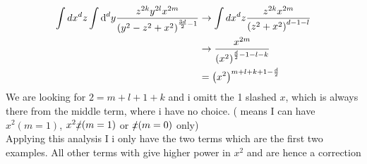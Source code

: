 \begin{align}
	\int dx ^d z\int \text{d} ^d y\frac{z^{2k} y^{2l} x^{2m}}{\left(y^2-z^2+x^2\right)^{\frac{3d}{2}-1}}
	&\rightarrow
	\int dx ^d z \frac{z^{2k} x^{2m}}{\left(z^2+x^2\right)^{d-1-l}}
	\\
	&\rightarrow
	\frac{x^{2m}}{\left(x^2\right)^{\frac{d}{2}-1-l-k}}
	\\
	&=\left(x^2\right)^{m+l+k+1-\frac{d}{2}}
\end{align}
We are looking for $2=m+l+1+k$ and i omitt the 1 slashed $x$, which is always there from the middle term, where i have no choice. ( means I can have $x^2(m=1)$, $x^2 \slashed x(m=1)$ or $\slashed x(m=0)$ only)
\\
Applying this analysis I i only have the two terms which are the first two examples. All other terms with give higher power in $x^2$ and are hence a correction


